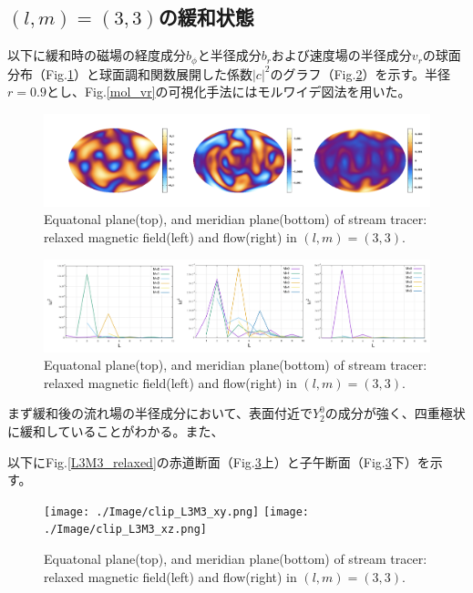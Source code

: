 \documentclass[12pt]{jsarticle}
\begin{document}
\subsection{$(l,m)=(3,3)$の緩和状態}
以下に緩和時の磁場の経度成分$b_\phi$と半径成分$b_r$および速度場の半径成分$v_r$の球面分布（Fig.\ref{moll_vr}）と球面調和関数展開した係数${|c|}^2$のグラフ（Fig.\ref{ff_vr}）を示す。半径$r=0.9$とし、Fig.\ref{mol_vr}の可視化手法にはモルワイデ図法を用いた。
\begin{figure}[H]
\centering
\includegraphics[height=0.5\textheight,width=1.0\hsize,angle=0,keepaspectratio]{./Image/mollwide_bp_br_vr.png}
\caption{Equatonal plane(top), and meridian plane(bottom) of stream tracer: relaxed magnetic field(left) and flow(right) in $(l,m)=(3,3)$.}\label{moll_vr}
\end{figure}
\begin{figure}[H]
\centering
\includegraphics[height=0.5\textheight,width=1.0\hsize,angle=0,keepaspectratio]{./Image/ff_bp_br_vr.png}
\caption{Equatonal plane(top), and meridian plane(bottom) of stream tracer: relaxed magnetic field(left) and flow(right) in $(l,m)=(3,3)$.}\label{ff_vr}
\end{figure}

まず緩和後の流れ場の半径成分において、表面付近で$Y_2^0$の成分が強く、四重極状に緩和していることがわかる。また、

以下にFig.\ref{L3M3_relaxed}の赤道断面（Fig.\ref{clip_L3M3_xy}上）と子午断面（Fig.\ref{clip_L3M3_xy}下）を示す。
\begin{figure}[H]
\centering
\texttt{[image: ./Image/clip\_L3M3\_xy.png]}
\texttt{[image: ./Image/clip\_L3M3\_xz.png]}
\caption{Equatonal plane(top), and meridian plane(bottom) of stream tracer: relaxed magnetic field(left) and flow(right) in $(l,m)=(3,3)$.}\label{clip_L3M3_xy}
\end{figure}
\end{document}
